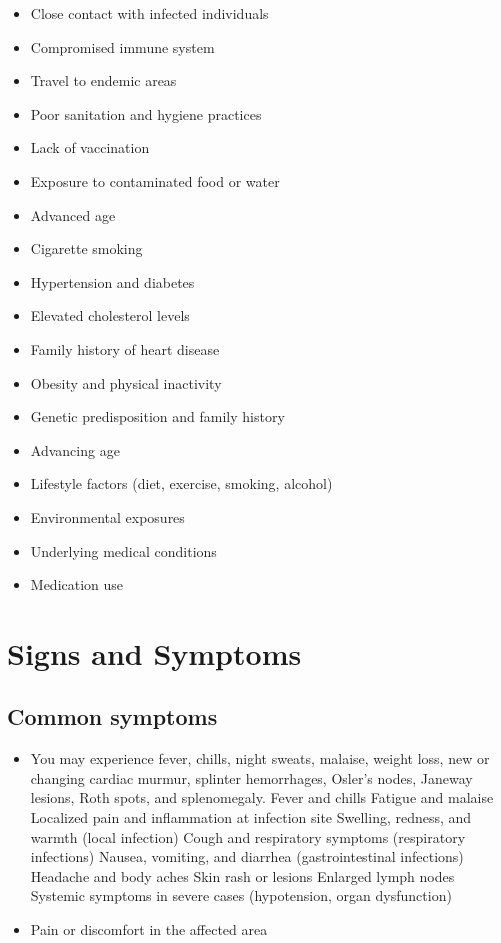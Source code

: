 \begin{itemize}[noitemsep]
  \item Close contact with infected individuals
  \item Compromised immune system
  \item Travel to endemic areas
  \item Poor sanitation and hygiene practices
  \item Lack of vaccination
  \item Exposure to contaminated food or water
  \item Advanced age
  \item Cigarette smoking
  \item Hypertension and diabetes
  \item Elevated cholesterol levels
  \item Family history of heart disease
  \item Obesity and physical inactivity
  \item Genetic predisposition and family history
  \item Advancing age
  \item Lifestyle factors (diet, exercise, smoking, alcohol)
  \item Environmental exposures
  \item Underlying medical conditions
  \item Medication use
\end{itemize}
\section{Signs and Symptoms}

\subsection{Common symptoms}
\begin{itemize}[noitemsep]
  \item You may experience fever, chills, night sweats, malaise, weight loss, new or changing cardiac murmur, splinter hemorrhages, Osler's nodes, Janeway lesions, Roth spots, and splenomegaly. Fever and chills Fatigue and malaise Localized pain and inflammation at infection site Swelling, redness, and warmth (local infection) Cough and respiratory symptoms (respiratory infections) Nausea, vomiting, and diarrhea (gastrointestinal infections) Headache and body aches Skin rash or lesions Enlarged lymph nodes Systemic symptoms in severe cases (hypotension, organ dysfunction)

  \item Pain or discomfort in the affected area
  \end{itemize}

